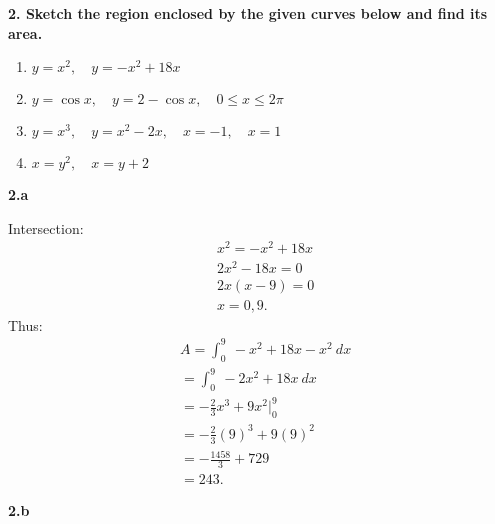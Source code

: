 \documentclass{report}
\begin{document}
    \pagebreak 
    \begin{mdframed}
        \textbf{2. Sketch the region enclosed by the given curves below and find its area.}
        \begin{enumerate}[label=(\alph*)]
            \item \( y = x^2, \quad y = -x^2 + 18x \)
            \item \( y = \cos x, \quad y = 2 - \cos x, \quad 0 \leq x \leq 2\pi \)
            \item \( y = x^3, \quad y = x^2 - 2x, \quad x = -1, \quad x = 1 \)
            \item \( x = y^2, \quad x = y + 2 \)
        \end{enumerate}
    \end{mdframed}

    \bigbreak \noindent 
    \textbf{2.a}
    \bigbreak \noindent 
    \begin{minipage}[]{0.47\textwidth}
    \end{minipage}
    \begin{minipage}[]{0.47\textwidth}
    Intersection:
    \begin{align*}
        &x^{2} = -x^{2} + 18x \\
        &2x^{2} - 18x = 0  \\
        & 2x(x-9) = 0 \\
        &x=0,9
    .\end{align*}
    Thus:
    \begin{align*}
        &A = \int_{0}^{9}\ -x^{2}+18x-x^{2}\ dx \\
        &= \int_{0}^{9}\ -2x^{2}+18x\ dx \\
        &= -\frac{2}{3}x^{3} + 9x^{2} \bigg|_0^9 \\
        &= -\frac{2}{3}(9)^{3} + 9(9)^{2} \\
        &= -\frac{1458}{3} + 729 \\
        &=243
    .\end{align*}
    \end{minipage}
    \bigbreak \noindent 
    \textbf{2.b}
    \bigbreak \noindent 
    \begin{minipage}[]{0.47\textwidth}
    \end{minipage}
\end{document}
